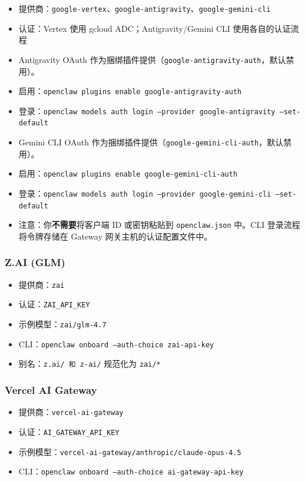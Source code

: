 \begin{itemize}
  \item 提供商：\texttt{google-vertex}、\texttt{google-antigravity}、\texttt{google-gemini-cli}
  \item 认证：Vertex 使用 gcloud ADC；Antigravity/Gemini CLI 使用各自的认证流程
  \item Antigravity OAuth 作为捆绑插件提供（\texttt{google-antigravity-auth}，默认禁用）。
  \item 启用：\texttt{openclaw plugins enable google-antigravity-auth}
  \item 登录：\texttt{openclaw models auth login --provider google-antigravity --set-default}
  \item Gemini CLI OAuth 作为捆绑插件提供（\texttt{google-gemini-cli-auth}，默认禁用）。
  \item 启用：\texttt{openclaw plugins enable google-gemini-cli-auth}
  \item 登录：\texttt{openclaw models auth login --provider google-gemini-cli --set-default}
  \item 注意：你\textbf{不需要}将客户端 ID 或密钥粘贴到 \texttt{openclaw.json} 中。CLI 登录流程将令牌存储在 Gateway 网关主机的认证配置文件中。
\end{itemize}


\subsubsection{Z.AI (GLM)}


\begin{itemize}
  \item 提供商：\texttt{zai}
  \item 认证：\texttt{ZAI\_API\_KEY}
  \item 示例模型：\texttt{zai/glm-4.7}
  \item CLI：\texttt{openclaw onboard --auth-choice zai-api-key}
  \item 别名：\texttt{z.ai/\textit{} 和 \texttt{z-ai/}} 规范化为 \texttt{zai/*}
\end{itemize}


\subsubsection{Vercel AI Gateway}


\begin{itemize}
  \item 提供商：\texttt{vercel-ai-gateway}
  \item 认证：\texttt{AI\_GATEWAY\_API\_KEY}
  \item 示例模型：\texttt{vercel-ai-gateway/anthropic/claude-opus-4.5}
  \item CLI：\texttt{openclaw onboard --auth-choice ai-gateway-api-key}
\end{itemize}


